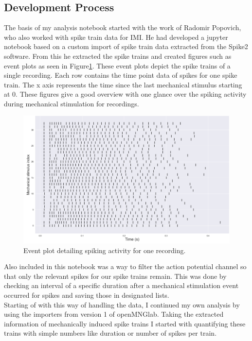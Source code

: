 \subsection{Development Process}
The basis of my analysis notebook started with the work of Radomir Popovich, who also worked with spike train data for IMI. He had developed a jupyter notebook based on a custom import of spike train data extracted from the Spike2 software. From this he extracted the spike trains and created figures such as event plots as seen in Figure\ref{fig:eventplot}. These event plots depict the spike trains of a single recording. Each row contains the time point data of spikes for one spike train. The x axis represents the time since the last mechanical stimulus starting at 0. These figures give a good overview with one glance over the spiking activity during mechanical stimulation for recordings.
\begin{figure}
	\includegraphics[width = \textwidth]{src/pic/event_plot}
	\caption{Event plot detailing spiking activity for one recording.}
	\label{fig:eventplot}
\end{figure}
Also included in this notebook was a way to filter the action potential channel so that only the relevant spikes for our spike trains remain. This was done by checking an interval of a specific duration after a mechanical stimulation event occurred for spikes and saving those in designated lists.\\
Starting of with this way of handling the data, I continued my own analysis by using the importers from version 1 of openMNGlab. Taking the extracted information of mechanically induced spike trains I started with quantifying these trains with simple numbers like duration or number of spikes per train.\\
